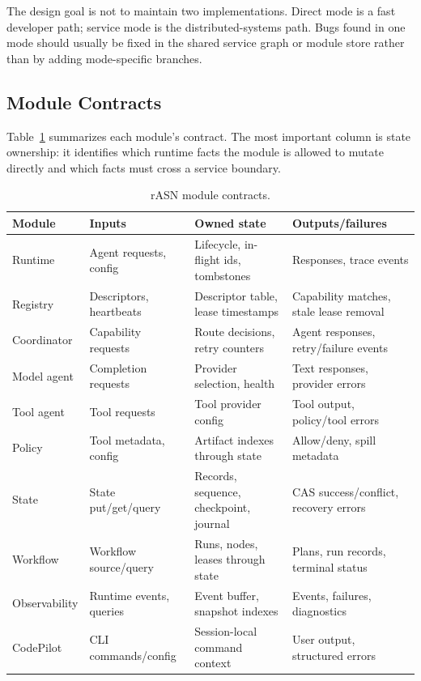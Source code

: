 \documentclass[manuscript,screen,review]{acmart}
\newcommand{\rasn}{rASN\xspace}
\begin{document}
The design goal is not to maintain two implementations. Direct mode is a fast
developer path; service mode is the distributed-systems path. Bugs found in one
mode should usually be fixed in the shared service graph or module store rather
than by adding mode-specific branches.

\subsection{Module Contracts}

Table~\ref{tab:module-contracts} summarizes each module's contract. The most
important column is state ownership: it identifies which runtime facts the
module is allowed to mutate directly and which facts must cross a service
boundary.

\begin{table}[t]
\caption{\rasn module contracts.}
\label{tab:module-contracts}
\centering
\small
\begin{tabular}{p{}p{}p{}p{}}
\toprule
Module & Inputs & Owned state & Outputs/failures \\
\midrule
Runtime & Agent requests, config & Lifecycle, in-flight ids, tombstones & Responses, trace events \\
Registry & Descriptors, heartbeats & Descriptor table, lease timestamps & Capability matches, stale lease removal \\
Coordinator & Capability requests & Route decisions, retry counters & Agent responses, retry/failure events \\
Model agent & Completion requests & Provider selection, health & Text responses, provider errors \\
Tool agent & Tool requests & Tool provider config & Tool output, policy/tool errors \\
Policy & Tool metadata, config & Artifact indexes through state & Allow/deny, spill metadata \\
State & State put/get/query & Records, sequence, checkpoint, journal & CAS success/conflict, recovery errors \\
Workflow & Workflow source/query & Runs, nodes, leases through state & Plans, run records, terminal status \\
Observability & Runtime events, queries & Event buffer, snapshot indexes & Events, failures, diagnostics \\
CodePilot & CLI commands/config & Session-local command context & User output, structured errors \\
\bottomrule
\end{tabular}
\end{table}
\end{document}

